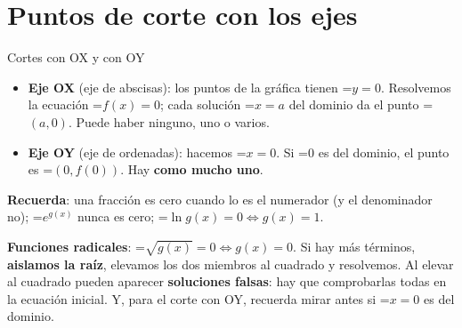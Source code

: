 \documentclass[11pt,a4paper]{article}
\newcommand{\fmm}[1]{\setbox0=\hbox{$#1$}\ifdim\wd0>\linewidth\[#1\]\else\mbox{\box0}\fi}
\newcommand{\fmuline}[1]{\textbf{\color{fmaccent}#1}}
\begin{document}
  
\section{Puntos de corte con los ejes}\hypertarget{sec2}{}

  

  
\begin{fmdef}{Cortes con OX y con OY}
\begin{itemize}
\item \textbf{Eje OX} (eje de abscisas): los puntos de la gráfica tienen \fmm{y=0}. Resolvemos la ecuación \fmm{f(x)=0}; cada solución \fmm{x=a} del dominio da el punto \fmm{(a,0)}. Puede haber ninguno, uno o varios.
\item \textbf{Eje OY} (eje de ordenadas): hacemos \fmm{x=0}. Si \fmm{0} es del dominio, el punto es \fmm{(0,f(0))}. Hay \textbf{como mucho uno}.
\end{itemize}

      
\begin{fmnote}\fmuline{Recuerda}: una fracción es cero cuando lo es el numerador (y el denominador no); \fmm{e^{g(x)}} nunca es cero; \fmm{\ln g(x)=0\Leftrightarrow g(x)=1}.\end{fmnote}

      
\begin{fmnote}\fmuline{Funciones radicales}: \fmm{\sqrt{g(x)}=0\Leftrightarrow g(x)=0}. Si hay más términos, \textbf{aislamos la raíz}, elevamos los dos miembros al cuadrado y resolvemos. Al elevar al cuadrado pueden aparecer \textbf{soluciones falsas}: hay que comprobarlas todas en la ecuación inicial. Y, para el corte con OY, recuerda mirar antes si \fmm{x=0} es del dominio.\end{fmnote}
\end{fmdef}
\end{document}
